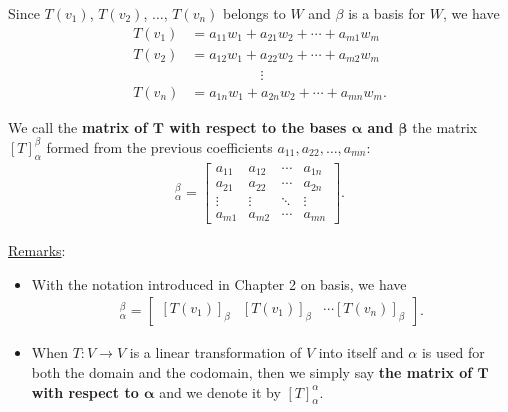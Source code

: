 \documentclass[12pt,a4paper]{article}
\begin{document}
	Since $T(v_1)$, $T(v_2)$, $\ldots$, $T(v_n)$ belongs to $W$ and $\beta$ is a basis for $W$, we have
		\begin{align*}
		T(v_1) &= a_{11} w_1 + a_{21} w_2 + \cdots + a_{m1} w_m \\
		T(v_2) &= a_{12} w_1 + a_{22} w_2 + \cdots + a_{m2} w_m \\
		& \phantom{2222222222} \vdots \\
		T(v_n) &= a_{1n} w_1 + a_{2n} w_2 + \cdots + a_{mn} w_m .
		\end{align*}
	
	We call the \textbf{matrix of $\mathbf{T}$ with respect to the bases $\mathbf{\alpha}$ and $\mathbf{\beta}$} the matrix $[T]_{\alpha}^\beta$ formed from the previous coefficients $a_{11} , a_{22} , \ldots , a_{mn}$:
		\begin{align*}
		[T]_{\alpha}^\beta =
		\begin{bmatrix}
		a_{11} & a_{12} & \cdots & a_{1n} \\
		a_{21} & a_{22} & \cdots & a_{2n} \\
		\vdots & \vdots & \ddots & \vdots \\
		a_{m1} & a_{m2} & \cdots & a_{mn}
		\end{bmatrix} .
		\end{align*}
	
	\underline{Remarks}:
	\begin{itemize}
	\item With the notation introduced in Chapter 2 on basis, we have
		\begin{align*}
		[T]_{\alpha}^\beta = \begin{bmatrix}
		[T(v_1)]_{\beta} & [T(v_1)]_\beta & \cdots [T(v_n)]_\beta 
		\end{bmatrix} .
		\end{align*}
	\item When $T : V \rightarrow V$ is a linear transformation of $V$ into itself and $\alpha$ is used for both the domain and the codomain, then we simply say \textbf{the matrix of $\mathbf{T}$ with respect to $\mathbf{\alpha}$} and we denote it by $[T]_\alpha^\alpha$.
	\end{itemize}
	
	\newpage
	
\end{document}
